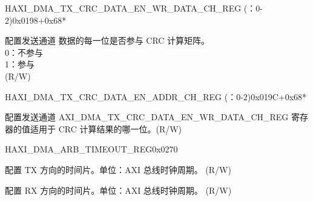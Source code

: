 \begin{register}{H}{AXI\_DMA\_TX\_CRC\_DATA\_EN\_WR\_DATA\_CH\_REG (：0-2)}{0x0198+0x68*}\label{regdesc:AXIDMATXCRCDATAENWRDATACHNREG}
%
%
\regnewline%
\begin{regdesc}\begin{reglist}
\label{fielddesc:AXIDMATXCRCDATAENWRDATACHN}\item [AXI\_DMA\_TX\_CRC\_DATA\_EN\_WR\_DATA\_CH\regindex{n}] 配置发送通道  数据的每一位是否参与 CRC 计算矩阵。\\
0：不参与\\
1：参与\\ (R/W)
\end{reglist}\end{regdesc}
\end{register}


\begin{register}{H}{AXI\_DMA\_TX\_CRC\_DATA\_EN\_ADDR\_CH\_REG (：0-2)}{0x019C+0x68*}\label{regdesc:AXIDMATXCRCDATAENADDRCHNREG}
%
\regnewline%
\begin{regdesc}\begin{reglist}
\label{fielddesc:AXIDMATXCRCDATAENADDRCHN}\item [AXI\_DMA\_TX\_CRC\_DATA\_EN\_ADDR\_CH\regindex{n}] 配置发送通道   AXI\_DMA\_TX\_CRC\_DATA\_EN\_WR\_DATA\_CH\_REG 寄存器的值适用于 CRC 计算结果的哪一位。(R/W)
\end{reglist}\end{regdesc}
\end{register}


\begin{register}{H}{AXI\_DMA\_ARB\_TIMEOUT\_REG}{0x0270}\label{regdesc:AXIDMAARBTIMEOUTREG}
%
%
\regnewline%
\begin{regdesc}\begin{reglist}
\label{fielddesc:AXIDMAARBTIMEOUTTX}\item [AXI\_DMA\_ARB\_TIMEOUT\_TX] 配置 TX 方向的时间片。单位：AXI 总线时钟周期。 (R/W)
\label{fielddesc:AXIDMAARBTIMEOUTRX}\item [AXI\_DMA\_ARB\_TIMEOUT\_RX] 配置 RX 方向的时间片。单位：AXI 总线时钟周期。 (R/W)
\end{reglist}\end{regdesc}
\end{register}


